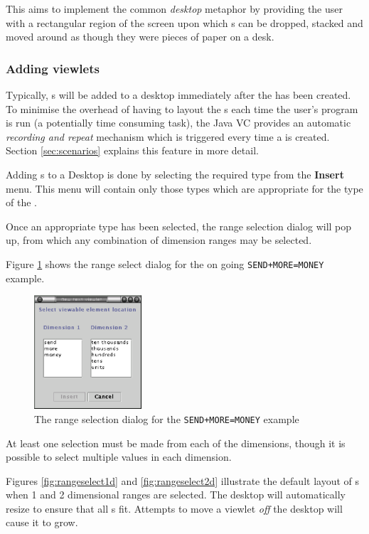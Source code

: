 This \viewer{} aims to implement the common \emph{desktop} metaphor by
providing the user with a rectangular region of the screen upon which
\viewlet{}s can be dropped, stacked and moved around as though they
were pieces of paper on a desk.

\subsubsection{Adding viewlets}
Typically, \viewlet{}s will be added to a desktop immediately after the
\viewer{} has been created.  To minimise the overhead of having to
layout the \viewlet{}s each time the user's program is run (a
potentially time consuming task), the Java VC provides an automatic
\emph{recording and repeat} mechanism which is triggered every time a
\viewer{} is created. Section \ref{sec:scenarios} explains this
feature in more detail.

Adding \viewlet{}s to a Desktop \viewer{} is done by selecting the
required \viewlet{} type from the \textbf{Insert} menu.  This menu
will contain only those \viewlet{} types which are appropriate for the
type of the \viewable{}.

Once an appropriate \viewlet{} type has been selected, the range
selection dialog will pop up, from which any combination of dimension
ranges may be selected.

Figure \ref{fig:rangeselect} shows the range select dialog for the on
going \texttt{SEND+MORE=MONEY} example.

\begin{figure}[htsp]
\centering
\includegraphics[width=4cm]{vcrangeselect}
\caption{The range selection dialog for the \texttt{SEND+MORE=MONEY} example}
\label{fig:rangeselect}
\end{figure}

At least one selection must be made from each of the dimensions,
though it is possible to select multiple values in each dimension.

Figures \ref{fig:rangeselect1d} and \ref{fig:rangeselect2d} illustrate
the default layout of \viewlet{}s when 1 and 2 dimensional ranges are
selected. The desktop will automatically resize to ensure that all
\viewlet{}s fit.  Attempts to move a viewlet \emph{off} the desktop
will cause it to grow.

